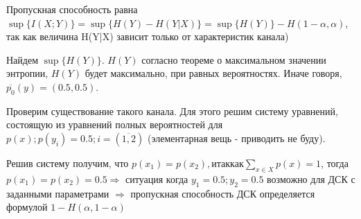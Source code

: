 \documentclass[../main.tex]{subfiles}
\begin{document}
Пропускная способность равна $\sup{\{I(X;Y)\}} = \sup\{H(Y)-H(Y|X)\} = \sup\{H(Y)\} - H(1-\alpha, \alpha)$, так как величина H(Y|X) зависит только от характеристик канала)

Найдем $\sup\{H(Y)\}$. $H(Y)$ согласно теореме о максимальном значении энтропии, $H(Y)$ будет максимально, при равных вероятностях. Иначе говоря, $\overline{p_{0}}(y)=(0.5,0.5)$. 

Проверим существование такого канала. Для этого решим систему уравнений, состоящую из уравнений полных вероятностей для $p(x); p(y_i) =0.5; i=(\overline{1,2})$ (элементарная вещь - приводить не буду). 

Решив систему получим, что $p(x_1)=p(x_2), и так как \sum\limits_{x \in X}p(x)=1$, тогда $p(x_1)=p(x_2)=0.5 \Rightarrow$ ситуация когда $y_1=0.5; y_2=0.5$ возможно для ДСК с заданными параметрами $\Rightarrow$ пропускная способность ДСК определяется формулой $1-H(\alpha, 1-\alpha)$
\end{document}
